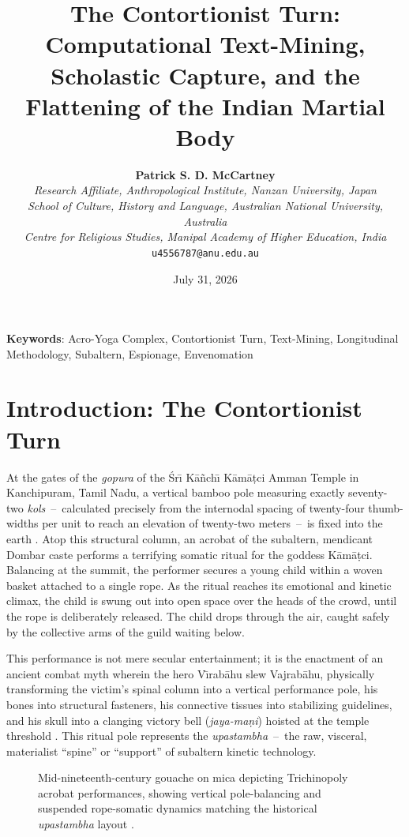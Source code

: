 \documentclass[11pt,twoside,letterpaper]{article}
\title{\textbf{The Contortionist Turn:\\Computational Text-Mining, Scholastic Capture, and the Flattening of the Indian Martial Body}}
\author{\textbf{Patrick S. D. McCartney}\\
\textit{Research Affiliate, Anthropological Institute, Nanzan University, Japan}\\
\textit{School of Culture, History and Language, Australian National University, Australia}\\
\textit{Centre for Religious Studies, Manipal Academy of Higher Education, India}\\
\texttt{u4556787@anu.edu.au}}\date{July 31, 2026}
\newcommand{\gdash}{\, -- \,}
\begin{document}
\maketitle

\textbf{Keywords}: Acro-Yoga Complex, Contortionist Turn, Text-Mining, Longitudinal Methodology, Subaltern, Espionage, Envenomation


\newpage



\section{Introduction: The Contortionist Turn}

At the gates of the \textit{gopura} of the \'{S}r\={\i} K\={a}\~{n}ch\={\i} K\={a}m\={a}\d{t}ci Amman Temple in Kanchipuram, Tamil Nadu, a vertical bamboo pole measuring exactly seventy-two \textit{kols}\gdash calculated precisely from the internodal spacing of twenty-four thumb-widths per unit to reach an elevation of twenty-two meters\gdash is fixed into the earth \citep{Raghavan1978, Stanley-Millson1984}. Atop this structural column, an acrobat of the subaltern, mendicant Dombar caste performs a terrifying somatic ritual for the goddess K\={a}m\={a}\d{t}ci. Balancing at the summit, the performer secures a young child within a woven basket attached to a single rope. As the ritual reaches its emotional and kinetic climax, the child is swung out into open space over the heads of the crowd, until the rope is deliberately released. The child drops through the air, caught safely by the collective arms of the guild waiting below. 

This performance is not mere secular entertainment; it is the enactment of an ancient combat myth wherein the hero V\={\i}rab\={a}hu slew Vajrab\={a}hu, physically transforming the victim's spinal column into a vertical performance pole, his bones into structural fasteners, his connective tissues into stabilizing guidelines, and his skull into a clanging victory bell (\textit{jaya-ma\d{n}i}) hoisted at the temple threshold \citep{ThurstonRangachari1909}. This ritual pole represents the \textit{upastambha}\gdash the raw, visceral, materialist ``spine'' or ``support'' of subaltern kinetic technology.

\begin{figure}[htbp]
    \centering
    \caption{Mid-nineteenth-century gouache on mica depicting Trichinopoly acrobat performances, showing vertical pole-balancing and suspended rope-somatic dynamics matching the historical \textit{upastambha} layout \citep{VAM2024}.}
    \label{fig:kamatchi_acrobats}
\end{figure}
\end{document}
